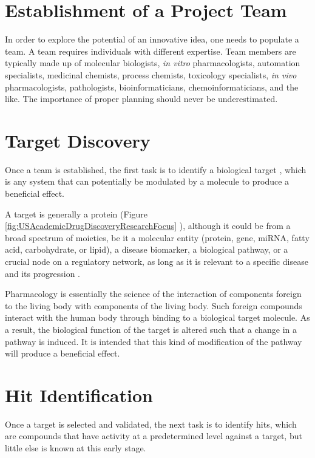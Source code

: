 \section{Establishment of a Project Team}

In order to explore the potential of an innovative idea, one needs to populate a team. A team requires individuals with different expertise. Team members are typically made up of molecular biologists, \textit{in vitro} pharmacologists, automation specialists, medicinal chemists, process chemists, toxicology specialists, \textit{in vivo} pharmacologists, pathologists, bioinformaticians, chemoinformaticians, and the like. The importance of proper planning should never be underestimated.

\section{Target Discovery}

Once a team is established, the first task is to identify a biological target \citep{706,355,356,357,797}, which is any system that can potentially be modulated by a molecule to produce a beneficial effect.

A target is generally a protein (Figure \ref{fig:USAcademicDrugDiscoveryResearchFocus} \citep{721}), although it could be from a broad spectrum of moieties, be it a molecular entity (protein, gene, miRNA, fatty acid, carbohydrate, or lipid), a disease biomarker, a biological pathway, or a crucial node on a regulatory network, as long as it is relevant to a specific disease and its progression \citep{711}.

Pharmacology is essentially the science of the interaction of components foreign to the living body with components of the living body. Such foreign compounds interact with the human body through binding to a biological target molecule. As a result, the biological function of the target is altered such that a change in a pathway is induced. It is intended that this kind of modification of the pathway will produce a beneficial effect.

\section{Hit Identification}

Once a target is selected and validated, the next task is to identify hits, which are compounds that have activity at a predetermined level against a target, but little else is known at this early stage.

